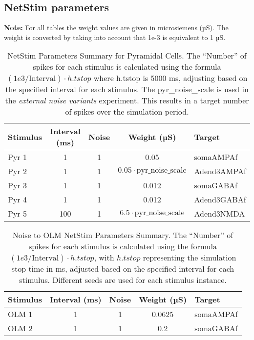 \subsection{NetStim parameters}
\textbf{Note:} For all tables the weight values are given in microsiemens (µS).
The weight is converted by taking into account that 1e-3 is equivalent to 1 µS.
\begin{table}[htbp]
    \centering
    \caption[NetStim Parameters Pyramidal cells]{NetStim Parameters Summary for Pyramidal Cells.
        The ``Number'' of spikes for each stimulus is calculated using the formula \((1e3 / \text{Interval}) \cdot h.tstop\) where h.tstop is 5000 ms,
        adjusting based on the specified interval for each stimulus.
        The pyr\_noise\_scale is used in the \textit{external noise variants} experiment.
        This results in a target number of spikes over the simulation period.}\label{table:netstimparams_pyr}
    \begin{tabular}{lcccl}
        \hline
        Stimulus & Interval (ms) & Noise & Weight (µS)                    & Target \\
        \hline
        Pyr 1             & 1                      & 1              & 0.05                                    & somaAMPAf       \\
        Pyr 2             & 1                      & 1              & \(0.05 \cdot \text{pyr\_noise\_scale}\) & Adend3AMPAf     \\
        Pyr 3             & 1                      & 1              & 0.012                                   & somaGABAf       \\
        Pyr 4             & 1                      & 1              & 0.012                                   & Adend3GABAf     \\
        Pyr 5             & 100                    & 1              & \(6.5 \cdot \text{pyr\_noise\_scale}\)  & Adend3NMDA      \\ \hline
    \end{tabular}
\end{table}

\begin{table}[htbp]
    \centering
    \caption[Noise to OLM Parameters]{Noise to OLM NetStim Parameters Summary.
        The ``Number'' of spikes for each stimulus is calculated using the formula \((1e3 / \text{Interval}) \cdot h.tstop\),
        with \(h.tstop\) representing the simulation stop time in ms,
        adjusted based on the specified interval for each stimulus.
        Different seeds are used for each stimulus instance.}\label{tab:noise_to_OLM}
    \begin{tabular}{lcccl}
        \hline
        Stimulus & Interval (ms) & Noise & Weight (µS) & Target \\
        \hline
        OLM 1             & 1                      & 1              & 0.0625               & somaAMPAf       \\
        OLM 2             & 1                      & 1              & 0.2                  & somaGABAf       \\
        \hline
    \end{tabular}
\end{table}

